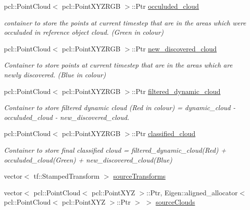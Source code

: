 \begin{DoxyCompactItemize}
pcl\+::\+Point\+Cloud$<$ pcl\+::\+Point\+X\+Y\+Z\+R\+GB $>$\+::Ptr \hyperlink{classdatmo_1_1cloud__segmentation_a2f85f1a51b2e90dbce996d90cb3e0155}{occuluded\+\_\+cloud}
\begin{DoxyCompactList}\small\item\em container to store the points at current timestep that are in the areas which were occuluded in reference object cloud. (Green in colour) \end{DoxyCompactList}\item 
pcl\+::\+Point\+Cloud$<$ pcl\+::\+Point\+X\+Y\+Z\+R\+GB $>$\+::Ptr \hyperlink{classdatmo_1_1cloud__segmentation_ac9374ddec382dc6dab33b34542a7b21d}{new\+\_\+discovered\+\_\+cloud}
\begin{DoxyCompactList}\small\item\em Container to store points at current timestep that are in the areas which are newly discovered. (Blue in colour) \end{DoxyCompactList}\item 
pcl\+::\+Point\+Cloud$<$ pcl\+::\+Point\+X\+Y\+Z\+R\+GB $>$\+::Ptr \hyperlink{classdatmo_1_1cloud__segmentation_a57c83961f5b33aa5655c679789f36387}{filtered\+\_\+dynamic\+\_\+cloud}
\begin{DoxyCompactList}\small\item\em Container to store filtered dynamic cloud (Red in colour) = dynamic\+\_\+cloud -\/ occuluded\+\_\+cloud -\/ new\+\_\+discovered\+\_\+cloud. \end{DoxyCompactList}\item 
pcl\+::\+Point\+Cloud$<$ pcl\+::\+Point\+X\+Y\+Z\+R\+GB $>$\+::Ptr \hyperlink{classdatmo_1_1cloud__segmentation_a5d51c3fb6f6206ce1e625bd3536414a0}{classified\+\_\+cloud}
\begin{DoxyCompactList}\small\item\em Container to store final classified cloud = filtered\+\_\+dynamic\+\_\+cloud(\+Red) + occuluded\+\_\+cloud(\+Green) + new\+\_\+discovered\+\_\+cloud(\+Blue) \end{DoxyCompactList}\item 
vector$<$ tf\+::\+Stamped\+Transform $>$ \hyperlink{classdatmo_1_1cloud__segmentation_a24a81e37b2eff06482f65b09e39af9e4}{source\+Transforms}
\item 
vector$<$ pcl\+::\+Point\+Cloud$<$ pcl\+::\+Point\+X\+YZ $>$\+::Ptr, Eigen\+::aligned\+\_\+allocator$<$ pcl\+::\+Point\+Cloud$<$ pcl\+::\+Point\+X\+YZ $>$\+::Ptr $>$ $>$ \hyperlink{classdatmo_1_1cloud__segmentation_abcf359aaf4f17128e961473692d9c473}{source\+Clouds}

\end{DoxyCompactItemize}
